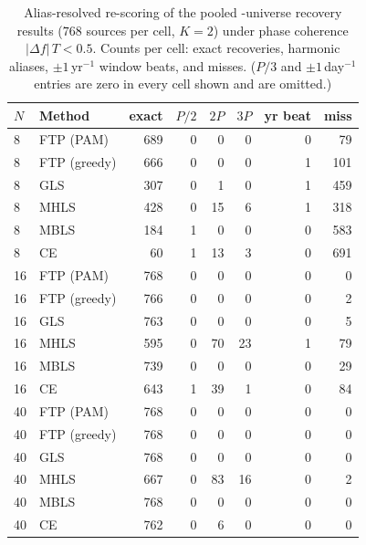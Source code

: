 \documentclass[apj]{emulateapj}
\begin{document}
\begin{appendix}
\begin{table}
\centering
\caption{\label{tab:aliases}
Alias-resolved re-scoring of the pooled \citet{Sesar_etal_2010}-universe
recovery results ($768$ sources per cell, $K = 2$) under phase coherence
$|\Delta f|\,T < 0.5$.  Counts per cell: exact recoveries, harmonic
aliases, $\pm1$\,yr$^{-1}$ window beats, and misses.  ($P/3$ and
$\pm1$\,day$^{-1}$ entries are zero in every cell shown and are
omitted.)}
\footnotesize
\begin{tabular}{llrrrrrr}
\hline\hline
$N$ & Method & exact & $P/2$ & $2P$ & $3P$ & yr beat & miss \\
\hline
 8 & FTP (PAM)    & 689 & 0 & 0  & 0  & 0 & 79  \\
 8 & FTP (greedy) & 666 & 0 & 0  & 0  & 1 & 101 \\
 8 & GLS          & 307 & 0 & 1  & 0  & 1 & 459 \\
 8 & MHLS         & 428 & 0 & 15 & 6  & 1 & 318 \\
 8 & MBLS         & 184 & 1 & 0  & 0  & 0 & 583 \\
 8 & CE           &  60 & 1 & 13 & 3  & 0 & 691 \\
\hline
16 & FTP (PAM)    & 768 & 0 & 0  & 0  & 0 & 0   \\
16 & FTP (greedy) & 766 & 0 & 0  & 0  & 0 & 2   \\
16 & GLS          & 763 & 0 & 0  & 0  & 0 & 5   \\
16 & MHLS         & 595 & 0 & 70 & 23 & 1 & 79  \\
16 & MBLS         & 739 & 0 & 0  & 0  & 0 & 29  \\
16 & CE           & 643 & 1 & 39 & 1  & 0 & 84  \\
\hline
40 & FTP (PAM)    & 768 & 0 & 0  & 0  & 0 & 0   \\
40 & FTP (greedy) & 768 & 0 & 0  & 0  & 0 & 0   \\
40 & GLS          & 768 & 0 & 0  & 0  & 0 & 0   \\
40 & MHLS         & 667 & 0 & 83 & 16 & 0 & 2   \\
40 & MBLS         & 768 & 0 & 0  & 0  & 0 & 0   \\
40 & CE           & 762 & 0 & 6  & 0  & 0 & 0   \\
\hline
\end{tabular}
\end{table}

\end{appendix}
\end{document}
